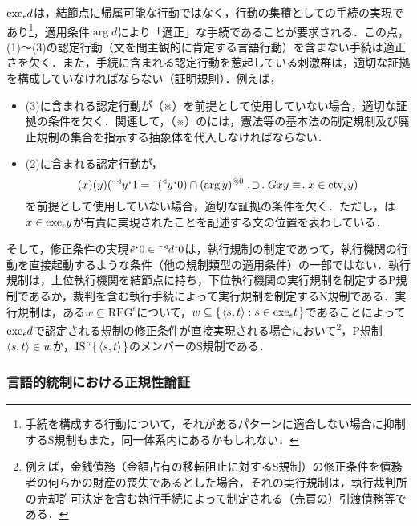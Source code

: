 $ \mathrm{exe}_{\epsilon}{d} $は，結節点に帰属可能な行動ではなく，行動の集積としての手続の実現であり\footnote{
    手続を構成する行動について，それがあるパターンに適合しない場合に抑制するS規制もまた，同一体系内にあるかもしれない．
}，適用条件$ \arg d $により「適正」な手続であることが要求される．この点，(1)〜(3)の認定行動（文を間主観的に肯定する言語行動）を含まない手続は適正さを欠く．また，手続に含まれる認定行動を惹起している刺激群は，適切な証拠を構成していなければならない（証明規則）．例えば，
\begin{itemize}
    \item (3)に含まれる認定行動が（※）を前提として使用していない場合，適切な証拠の条件を欠く．関連して，（※）の\kagi{$ \alpha $}には，憲法等の基本法の制定規制及び廃止規制の集合を指示する抽象体を代入しなければならない．
    \item (2)に含まれる認定行動が，
    \[
        (x)(y)(\tildel{\trgl{y}}\fap 1 = \barl{(\trgl{y}\fap 0)}\cap\msec{(\arg y)}{0}\case{1}{1}{1}Gxy\case{3}{0}{1}x\in \cty{\epsilon}y)
    \]
    を前提として使用していない場合，適切な証拠の条件を欠く．ただし，は$ x\in\mathrm{exe}_{\epsilon} y $が有責に実現されたことを記述する文の位置を表わしている．
\end{itemize}
そして，修正条件の実現$ \tilde{e}{\mspace{1mu}{`}\mspace{1mu}} 0\in \tilde{\:\:}{^\triangleleft}d{\mspace{1mu}{`}\mspace{1mu}} 0 $は，執行規制の制定であって，執行機関の行動を直接起動するような条件（他の規制類型の適用条件）の一部ではない．執行規制は，上位執行機関を結節点に持ち，下位執行機関の実行規制を制定するP規制であるか，裁判を含む執行手続によって実行規制を制定するN規制である．実行規制は，ある$ w\subseteq\mathrm{REG}^\epsilon $について，$ w\subseteq\{\mspace{2mu}\langle s,t \rangle:s\in\mathrm{exe}_{\epsilon}t\mspace{2mu}\} $であることによって$ \mathrm{exe}_{\epsilon}d $で認定される規制の修正条件が直接実現される場合において\footnote{
    例えば，金銭債務（金額占有の移転阻止に対するS規制）の修正条件を債務者の何らかの財産の喪失であるとした場合，それの実行規制は，執行裁判所の売却許可決定を含む執行手続によって制定される（売買の）引渡債務等である．
}，P規制$\langle s,t \rangle\in w$か，$ \mathrm{IS}{\mspace{1mu}{``}\mspace{1mu}}\{\mspace{2mu}\langle s,t \rangle\mspace{2mu}\} $のメンバーのS規制である．

\subsubsection{言語的統制における正規性論証}
\label{sssec:言語的統制における正規性論証}

